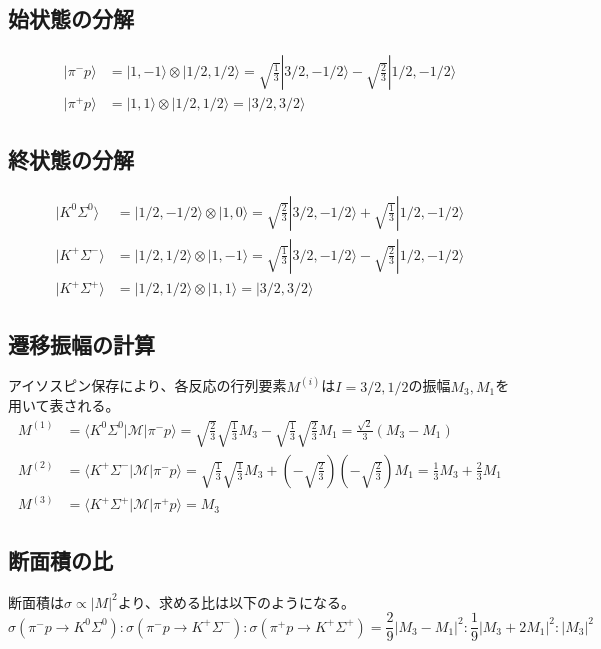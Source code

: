 \documentclass[autodetect-engine,11pt,a4paper]{bxjsarticle}
\begin{document}
\subsection*{始状態の分解}
\begin{align*}
    |\pi^- p\rangle &= |1, -1\rangle \otimes |1/2, 1/2\rangle = \sqrt{\frac{1}{3}}|3/2, -1/2\rangle - \sqrt{\frac{2}{3}}|1/2, -1/2\rangle \\
    |\pi^+ p\rangle &= |1, 1\rangle \otimes |1/2, 1/2\rangle = |3/2, 3/2\rangle
\end{align*}

\subsection*{終状態の分解}
\begin{align*}
    |K^0 \Sigma^0\rangle &= |1/2, -1/2\rangle \otimes |1, 0\rangle = \sqrt{\frac{2}{3}}|3/2, -1/2\rangle + \sqrt{\frac{1}{3}}|1/2, -1/2\rangle \\
    |K^+ \Sigma^-\rangle &= |1/2, 1/2\rangle \otimes |1, -1\rangle = \sqrt{\frac{1}{3}}|3/2, -1/2\rangle - \sqrt{\frac{2}{3}}|1/2, -1/2\rangle \\
    |K^+ \Sigma^+\rangle &= |1/2, 1/2\rangle \otimes |1, 1\rangle = |3/2, 3/2\rangle
\end{align*}

\subsection*{遷移振幅の計算}
アイソスピン保存により、各反応の行列要素$M^{(i)}$は$I=3/2, 1/2$の振幅$M_3, M_1$を用いて表される。
\begin{align*}
    M^{(1)} &= \langle K^0 \Sigma^0 | \mathcal{M} | \pi^- p \rangle = \sqrt{\frac{2}{3}}\sqrt{\frac{1}{3}}M_3 - \sqrt{\frac{1}{3}}\sqrt{\frac{2}{3}}M_1 = \frac{\sqrt{2}}{3}(M_3 - M_1) \\
    M^{(2)} &= \langle K^+ \Sigma^- | \mathcal{M} | \pi^- p \rangle = \sqrt{\frac{1}{3}}\sqrt{\frac{1}{3}}M_3 + \left(-\sqrt{\frac{2}{3}}\right)\left(-\sqrt{\frac{2}{3}}\right)M_1 = \frac{1}{3}M_3 + \frac{2}{3}M_1 \\
    M^{(3)} &= \langle K^+ \Sigma^+ | \mathcal{M} | \pi^+ p \rangle = M_3
\end{align*}

\subsection*{断面積の比}
断面積は$\sigma \propto |M|^2$より、求める比は以下のようになる。
\[
\sigma(\pi^- p \rightarrow K^0 \Sigma^0) : \sigma(\pi^- p \rightarrow K^+ \Sigma^-) : \sigma(\pi^+ p \rightarrow K^+ \Sigma^+) = \frac{2}{9}|M_3 - M_1|^2 : \frac{1}{9}|M_3 + 2M_1|^2 : |M_3|^2
\]
\end{document}

